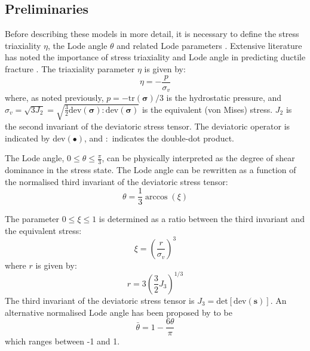\documentclass[sn-mathphys,Numbered]{sn-jnl}%
\newcommand{\bb}{\boldsymbol}
\begin{document}
\subsection{Preliminaries}
Before describing these models in more detail, it is necessary to define the stress triaxiality $\eta$, the Lode angle $\theta$ and related Lode parameters \cite{bai_new_2008, nahshon_modification_2008}.
Extensive literature has noted the importance of stress triaxiality and Lode angle in predicting ductile fracture \cite{besson_continuum_2010, cao_models_2017, tekkaya_damage_2020}.
The triaxiality parameter $\eta$ is given by:
\begin{equation} %
    \eta = -\frac{p}{\sigma_{v}}
\end{equation}
where, as noted previously, $p = -\text{tr}(\boldsymbol{\sigma})/3$ is the hydrostatic pressure, and $\sigma_{v} = \sqrt{3 J_2} = \sqrt{\frac{3}{2} \text{dev}(\bb{\sigma}) : \text{dev}(\bb{\sigma}) }$ is the equivalent (von Mises) stress.
$J_2$ is the second invariant of the deviatoric stress tensor.
The deviatoric operator is indicated by $\text{dev}(\bullet)$, and $:$ indicates the double-dot product.

The Lode angle, $0 \leq \theta \leq \frac{\pi}{3}$, can be physically interpreted as the degree of shear dominance in the stress state.
The Lode angle can be rewritten as a function of the normalised third invariant of the deviatoric stress tensor:
\begin{equation}
    \theta=\frac{1}{3} \arccos\left(\xi\right)
\end{equation}

The parameter $0 \leq \xi \leq 1$ is determined as a ratio between the third invariant and the equivalent stress:
\begin{equation}
	\xi = \left(\frac{r}{\sigma_{v}}\right)^3
\end{equation}
where $r$ is given by:
\begin{equation}
	r  = 3 \left(\frac{3}{2}J_3\right)^{1/3} %
\end{equation}
The third invariant of the deviatoric stress tensor is $J_3 = \text{det}[\text{dev}(\bb{s})]$.
An alternative normalised Lode angle has been proposed by \citet{bai_new_2008} to be
\begin{equation}
	\bar{\theta}=1-\frac{6\theta}{\pi}	
\end{equation}
which ranges between -1 and 1.
\end{document}
